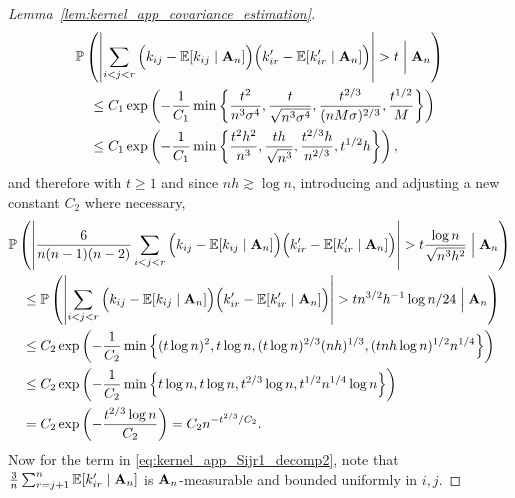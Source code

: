 \begin{proof}[Lemma~\ref{lem:kernel_app_covariance_estimation}]
\begin{align*}
    &\mathbb{P}\left(
      \left|
      \sum_{i<j<r}
      \Big(
        k_{i j}
        - \mathbb{E}[k_{i j} \mid \mathbf{A}_n]
      \Big)
      \Big(
        k_{i r}'
        - \mathbb{E}[k_{i r}' \mid \mathbf{A}_n]
      \Big)
      \right|
      > t
      \biggm\vert \mathbf{A}_n
    \right) \\
    &\quad\leq
    C_1 \exp\left(
      -\frac{1}{C_1}
      \min \left\{
        \frac{t^2}{n^3 \sigma^4},
        \frac{t}{\sqrt{n^3 \sigma^4}},
        \frac{t^{2/3}}{(n M \sigma)^{2/3}},
        \frac{t^{1/2}}{M}
      \right\}
    \right) \\
    &\quad\leq
    C_1 \exp\left(
      -\frac{1}{C_1}
      \min \left\{
        \frac{t^2 h^2}{n^3},
        \frac{t h}{\sqrt{n^3}},
        \frac{t^{2/3} h}{n^{2/3}},
        t^{1/2} h
      \right\}
    \right),
  \end{align*}
  and therefore
  with $t \geq 1$
  and since
  $n h \gtrsim \log n$,
  introducing and adjusting a new
  constant $C_2$ where necessary,
  \begin{align*}
    &\mathbb{P}\left(
      \left|
      \frac{6}{n(n-1)(n-2)}
      \sum_{i<j<r}
      \Big(
        k_{i j}
        - \mathbb{E}[k_{i j} \mid \mathbf{A}_n]
      \Big)
      \Big(
        k_{i r}'
        - \mathbb{E}[k_{i r}' \mid \mathbf{A}_n]
      \Big)
      \right|
      > t
      \frac{\log n}{\sqrt{n^3 h^2}}
      \Bigm\vert \mathbf{A}_n
    \right) \\
    &\quad\leq
    \mathbb{P}\left(
      \left|
      \sum_{i<j<r}
      \Big(
        k_{i j}
        - \mathbb{E}[k_{i j} \mid \mathbf{A}_n]
      \Big)
      \Big(
        k_{i r}'
        - \mathbb{E}[k_{i r}' \mid \mathbf{A}_n]
      \Big)
      \right|
      > t
      n^{3/2} h^{-1} \log n / 24
      \Bigm\vert \mathbf{A}_n
    \right) \\
    &\quad\leq
    C_2 \exp\left(
      -\frac{1}{C_2}
      \min \left\{
        (t \log n)^2,
        t \log n,
        (t \log n)^{2/3} (n h)^{1/3},
        (t n h \log n)^{1/2} n^{1/4}
      \right\}
    \right) \\
    &\quad\leq
    C_2 \exp\left(
      -\frac{1}{C_2}
      \min \left\{
        t \log n,
        t \log n,
        t^{2/3} \log n,
        t^{1/2} n^{1/4} \log n
      \right\}
    \right) \\
    &\quad=
    C_2 \exp\left(
      -\frac{t^{2/3} \log n}{C_2}
    \right)
    =
    C_2
    n^{-t^{2/3} / C_2}.
  \end{align*}
  Now for the term
  in \eqref{eq:kernel_app_Sijr1_decomp2},
  note that
  $\frac{3}{n} \sum_{r=j+1}^n \mathbb{E}[k_{i r}' \mid \mathbf{A}_n]$
  is $\mathbf{A}_n$-measurable and bounded uniformly in $i,j$.

\end{proof}
